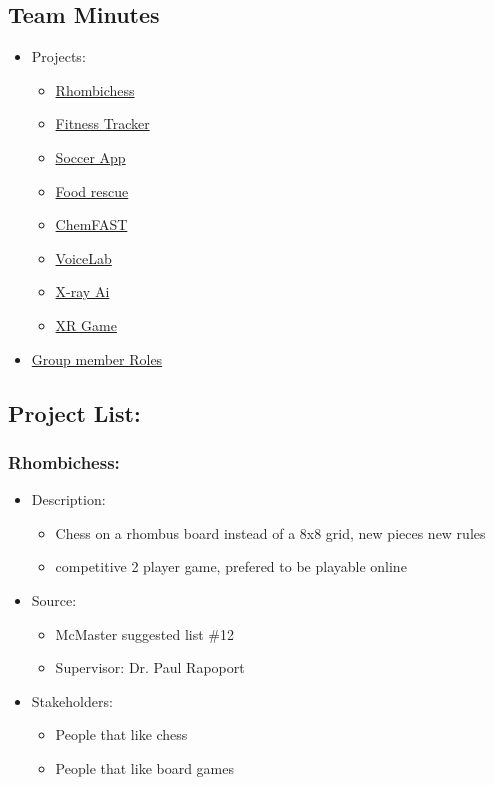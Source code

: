 \documentclass{article}
\begin{document}
\subsection*{Team Minutes}
\begin{itemize}
    \item Projects:
    \begin{itemize}
        \item \hyperref[subsec:chess]{Rhombichess}
        \item \hyperref[subsec:fitness]{Fitness Tracker}
        \item \hyperref[subsec:soccer]{Soccer App}
        \item \hyperref[subsec:foodrescue]{Food rescue}
        \item \hyperref[subsec:chemfast]{ChemFAST}
        \item \hyperref[subsec:voicelab]{VoiceLab}
        \item \hyperref[subsec:xray]{X-ray Ai}
        \item \hyperref[subsec:xrgame]{XR Game}
    \end{itemize}
    \item \hyperref[sec:roles]{Group member Roles}
\end{itemize}
\subsection*{Project List:}
\subsubsection*{Rhombichess:}
\label{subsec:chess}
\begin{itemize}
    \item Description:
    \begin{itemize}
        \item Chess on a rhombus board instead of a 8x8 grid, new pieces new rules
        \item competitive 2 player game, prefered to be playable online
    \end{itemize}
    \item Source:
    \begin{itemize}
        \item McMaster suggested list \#12
        \item Supervisor: Dr. Paul Rapoport
    \end{itemize}
    \item Stakeholders:
    \begin{itemize}
        \item People that like chess
        \item People that like board games
    \end{itemize}
\end{itemize}
\end{document}

